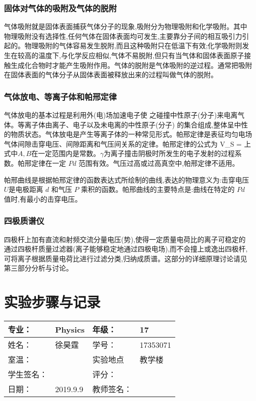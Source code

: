 \documentclass{ctexart}
\begin{document}
\subsubsection{固体对气体的吸附及气体的脱附}
气体吸附就是固体表面捕获气体分子的现象,吸附分为物理吸附和化学吸附。其中物理吸附没有选择性,任何气体在固体表面均可发生,主要靠分子间的相互吸引力引起的。物理吸附的气体容易发生脱附,而且这种吸附只在低温下有效;化学吸附则发生在较高的温度下,与化学反应相似,气体不易脱附,但只有当气体和固体表面原子接触生成化合物时才能产生吸附作用。气体的脱附是气体吸附的逆过程。通常把吸附在固体表面的气体分子从固体表面被释放出来的过程叫做气体的脱附。
\subsubsection{气体放电、等离子体和帕邢定律}
气体放电的基本过程是利用外(电)场加速电子使
之碰撞中性原子(分子)来电离气体。等离子体由离子、电子以及未电离的中性原子(分子)
的集合组成,整体呈中性的物质状态。气体放电是产生等离子体的一种常见形式。帕邢定律是表征均匀电场气体间隙击穿电压、间隙距离和气压间关系的定律。帕邢定律的公式为
\beq
V_S = 
\eeq
上式中$A,B$在一定范围内是常数。$\gamma$为离子撞击阴极时所发生的电子发射的过程系数。帕邢定律在一定 $Pd$ 范围有效。气压过高或过高真空中,帕邢定律不适用。

帕邢曲线是根据帕邢定律的函数表达式所绘制的曲线,表达的物理意义为:击穿电压$U$是电极距离 $d$ 和气压 $P$ 乘积的函数。帕邢曲线的主要特点是:曲线在特定的 $Pd$ 值时,有最小的击穿电压。
\subsubsection{四极质谱仪}
四极杆上加有直流和射频交流分量电压(势),使得一定质量电荷比的离子可稳定的通过四极杆质量过滤器(离子能够稳定地通过四极电场),而不会撞上或逸出四极杆,可将离子根据质量电荷比进行过滤分类,归纳成质谱。这部分的详细原理讨论请见第三部分分析与讨论。
\newpage
\section{实验步骤与记录}
\begin{tabular}{|p{8em}|p{8em}|p{8em}|p{8em}|}
	\hline 
	专业：     &Physics       &年级：      & 17     \\
	\hline
	姓名：& 徐昊霆 &学号：&17353071  \\
	\hline
	室温：&                    &实验地点 & 教学楼 \\
	\hline	
	学生签名： & & 评分： & \\
	\hline
	日期： & 2019.9.9 & 教师签名：&  \\
	\hline
\end{tabular}
\end{document}
